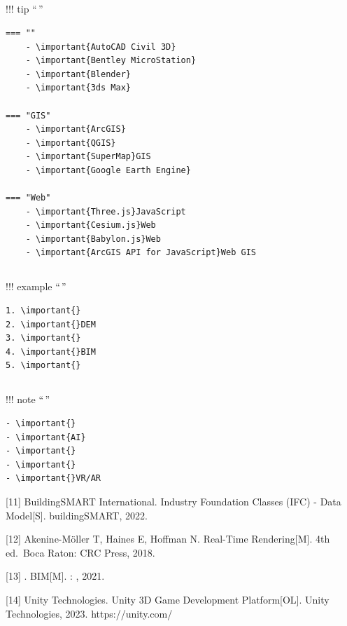 \hypertarget{section-5}{%
\subsection{}\label{section-5}}

!!! tip ``\,''

\begin{verbatim}
=== ""
    - \important{AutoCAD Civil 3D}
    - \important{Bentley MicroStation}
    - \important{Blender}
    - \important{3ds Max}
    
=== "GIS"
    - \important{ArcGIS}
    - \important{QGIS}
    - \important{SuperMap}GIS
    - \important{Google Earth Engine}
    
=== "Web"
    - \important{Three.js}JavaScript
    - \important{Cesium.js}Web
    - \important{Babylon.js}Web
    - \important{ArcGIS API for JavaScript}Web GIS
\end{verbatim}

\hypertarget{section-6}{%
\subsection{}\label{section-6}}

!!! example ``\,''

\begin{verbatim}
1. \important{}
2. \important{}DEM
3. \important{}
4. \important{}BIM
5. \important{}
\end{verbatim}

\hypertarget{section-7}{%
\subsection{}\label{section-7}}

!!! note ``\,''

\begin{verbatim}
- \important{}
- \important{AI}
- \important{}
- \important{}
- \important{}VR/AR
\end{verbatim}

{[}11{]} BuildingSMART International. Industry Foundation Classes (IFC)
- Data Model{[}S{]}. buildingSMART, 2022.

{[}12{]} Akenine-Möller T, Haines E, Hoffman N. Real-Time
Rendering{[}M{]}. 4th ed.~Boca Raton: CRC Press, 2018.

{[}13{]} . BIM{[}M{]}. : , 2021.

{[}14{]} Unity Technologies. Unity 3D Game Development Platform{[}OL{]}.
Unity Technologies, 2023. https://unity.com/

